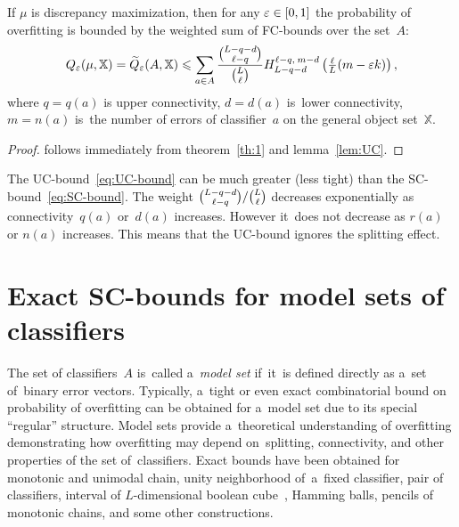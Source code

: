 \documentclass{article}
\let\cite\citep
\def\XX{\mathbb{X}}
\renewcommand{\leq}{\leqslant}
\newcommand{\wtil}{\widetilde}
\def\CC_#1^#2{\tbinom{#1}{#2}}
\newcommand{\hypergeom}[5]{{#1}_{#2}^{#4,\:#3}\left(#5\right)}
\newcommand{\Hyper}[4]{\hypergeom{H}{#1}{#2}{#3}{#4}}
\renewcommand{\emph}[1]{\textit{#1}}
\begin{document}
\begin{theorem}[UC-bound]
\label{th:UC-bound}
    If $\mu$ is discrepancy maximization, then for any ${\varepsilon\in[0,1]}$
    the probability of overfitting is bounded by the weighted sum of FC-bounds over the set~$A$:
    \begin{equation}
    \label{eq:UC-bound}
        Q_\eps(\mu,\XX)
        =
        \wtil Q_\eps(A,\XX)
        \leq
        \sum_{a\in A}
            \frac{\CC_{L-q-d}^{\ell-q}}{\CC_{L}^{\ell}}
            \Hyper{L-q-d}{m-d}{\ell-q}{\tfrac\ell L (m - \eps k)},
    \end{equation}
    where
    $q = q(a)$ is upper connectivity,\;
    $d = d(a)$ is~lower connectivity,\;
    $m = n(a)$ is~the number of errors
    of classifier~$a$ on the general object set~$\XX$.
\end{theorem}
\begin{proof}
    follows immediately from
    theorem~\ref{th:1} and
    lemma~\ref{lem:UC}.
\end{proof}

The UC-bound~\eqref{eq:UC-bound} can be much greater (less tight) than the SC-bound~\eqref{eq:SC-bound}.
The weight
${\CC_{L-q-d}^{\ell-q}} / {\CC_{L}^{\ell}}$
decreases exponentially as connectivity~$q(a)$ or~$d(a)$ increases.
However it~does not decrease as $r(a)$ or $n(a)$ increases.
This means that the UC-bound ignores the splitting effect.


\section{Exact SC-bounds for model sets of classifiers}
\label{sec:ModelSets}

The set of classifiers~$A$ is~called a~\emph{model set}
if~it~is defined directly as a~set of~binary error \mbox{vectors}.
Typically,
a~tight or even exact combinatorial bound on probability of overfitting can be obtained
for a~model set due to its special ``regular'' structure.
Model sets provide a~theoretical understanding of overfitting
demonstrating how overfitting may depend
on~splitting, connectivity, and other properties of the set of~classifiers.
Exact bounds have been obtained for
monotonic and unimodal chain,
unity neighborhood of~a~fixed classifier,
pair of classifiers,
interval of $L$-dimensional boolean cube~\cite{voron10pria-eng},
Hamming balls, pencils of monotonic chains,
and some other constructions.
\end{document}
